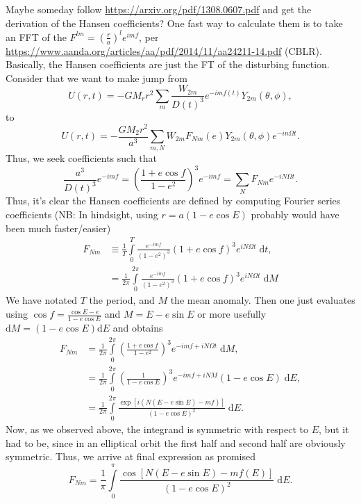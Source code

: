 \documentclass[11pt,
        usenames, %
        dvipsnames %
    ]{article}
\newcommand*{\p}[1]{\left(#1\right)}
\newcommand*{\s}[1]{\left[#1\right]}
\begin{document}
Maybe someday follow \url{https://arxiv.org/pdf/1308.0607.pdf} and get the
derivation of the Hansen coefficients? One fast way to calculate them is to take
an FFT of the $F^{lm} = \p{\frac{r}{a}}^l e^{imf}$, per
\url{https://www.aanda.org/articles/aa/pdf/2014/11/aa24211-14.pdf}%
(CBLR). Basically, the Hansen coefficients are just the FT of the disturbing
function. Consider that we want to make jump from
\begin{equation}
    U(r, t) = -GM_rr^2 \sum\limits_m \frac{W_{2m}}{D(t)^3}e^{-imf(t)}
        Y_{2m}\p{\theta, \phi},
\end{equation}
to
\begin{equation}
    U(r, t) = -\frac{GM_2r^2}{a^3}\sum\limits_{m, N} W_{2m}
        F_{Nm}(e) Y_{2m}\p{\theta, \phi} e^{-in\Omega t}.
\end{equation}
Thus, we seek coefficients such that
\begin{equation}
    \frac{a^3}{D(t)^3} e^{-imf} = \p{\frac{1 + e\cos f}{1 - e^2}}^3
            e^{-imf}
        = \sum\limits_N F_{Nm} e^{-iN\Omega t}.
\end{equation}
Thus, it's clear the Hansen coefficients are defined by computing Fourier series
coefficients (NB\@: In hindsight, using $r = a\p{1 - e\cos E}$ probably would
have been much faster/easier)
\begin{align}
    F_{Nm} &\equiv \frac{1}{T}\int\limits_{0}^T
        \frac{e^{-imf}}{\p{1 - e^2}^3}\p{1 + e\cos f}^3 e^{iN\Omega t}
            \;\mathrm{d}t,\\
        &= \frac{1}{2\pi} \int\limits_{0}^{2\pi}
            \frac{e^{-imf}}{\p{1 - e^2}^3}\p{1 + e\cos f}^3 e^{iN\Omega t}
                \;\mathrm{d}M
\end{align}
We have notated $T$ the period, and $M$ the mean anomaly. Then one just
evaluates using $\cos f = \frac{\cos E - e}{1 - e\cos E}$ and $M = E - e\sin E$
or more usefully $\mathrm{d}M = \p{1 - e\cos E}\mathrm{d}E$ and obtains
\begin{align}
    F_{Nm} &= \frac{1}{2\pi}\int\limits_0^{2\pi}
            \p{\frac{1 + e\cos f}{1 - e^2}}^3 e^{-imf + iN\Omega t}
                \;\mathrm{d}M,\\
        &= \frac{1}{2\pi}\int\limits_0^{2\pi}
            \p{\frac{1}{1 - e\cos E}}^3 e^{-imf + iN M} \p{1 - e\cos E}
                \;\mathrm{d}E,\\
        &= \frac{1}{2\pi}\int\limits_0^{2\pi}
            \frac{\exp\s{i\p{N\p{E - e\sin E} - mf}}}{(1 - e \cos E)^2}
                \;\mathrm{d}E.
\end{align}
Now, as we observed above, the integrand is symmetric with respect to $E$, but
it had to be, since in an elliptical orbit the first half and second half are
obviously symmetric. Thus, we arrive at final expression as promised
\begin{equation}
    F_{Nm} = \frac{1}{\pi}\int\limits_{0}^{\pi}
        \frac{\cos\s{N\p{E - e\sin E} - mf(E)}}
            {\p{1 - e\cos E}^2}\;\mathrm{d}E.
\end{equation}
\end{document}
